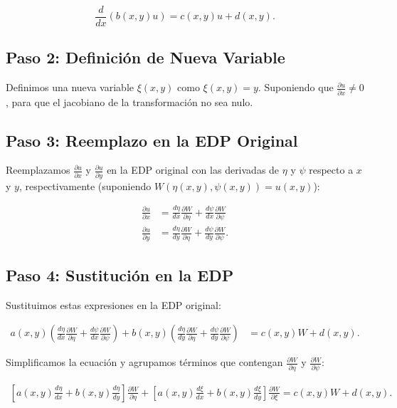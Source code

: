 \documentclass[11pt]{book}
\theoremstyle{plain}
\theoremstyle{definition}
\begin{document}
\begin{equation}
\frac{d}{dx} \left( b(x, y) u \right) = c(x, y) u + d(x,y).
\end{equation}

\subsection*{Paso 2: Definición de Nueva Variable}

Definimos una nueva variable $\xi(x, y)$ como $\xi(x, y) = y$. Suponiendo que $\frac{\partial u}{\partial x} \neq 0$, para que el jacobiano de la transformación no sea nulo.

\subsection*{Paso 3: Reemplazo en la EDP Original}
Reemplazamos $\frac{\partial u}{\partial x}$ y $\frac{\partial u}{\partial y}$ en la EDP original con las derivadas de $\eta$ y $\psi$ respecto a $x$ y $y$, respectivamente (suponiendo $W(\eta(x,y),\psi(x,y)) = u(x,y)$):

\begin{align}
\frac{\partial u}{\partial x} &= \frac{d\eta}{dx}\frac{\partial W}{\partial \eta} + \frac{d\psi}{dx}\frac{\partial W}{\partial \psi} \\
\frac{\partial u}{\partial y} &= \frac{d\eta}{dy}\frac{\partial W}{\partial \eta} + \frac{d\psi}{dy}\frac{\partial W}{\partial \psi}.
\end{align}

\subsection*{Paso 4: Sustitución en la EDP}
Sustituimos estas expresiones en la EDP original:

\begin{align}
a(x, y) \left(\frac{d\eta}{dx}\frac{\partial W}{\partial \eta} + \frac{d\psi}{dx}\frac{\partial W}{\partial \psi}\right) + b(x, y) \left(\frac{d\eta}{dy}\frac{\partial W}{\partial \eta} + \frac{d\psi}{dy}\frac{\partial W}{\partial \psi}\right) &= c(x, y) W + d(x,y).
\end{align}

Simplificamos la ecuación y agrupamos términos que contengan $\frac{\partial W}{\partial \eta}$ y $\frac{\partial W}{\partial \psi}$:

\begin{align}
\left[a(x, y)\frac{d\eta}{dx} + b(x, y)\frac{d\eta}{dy}\right]\frac{\partial W}{\partial \eta} + \left[a(x, y)\frac{d\xi}{dx} + b(x, y)\frac{d\xi}{dy}\right]\frac{\partial W}{\partial \xi} = c(x, y)W + d(x, y).
\end{align}
\end{document}

